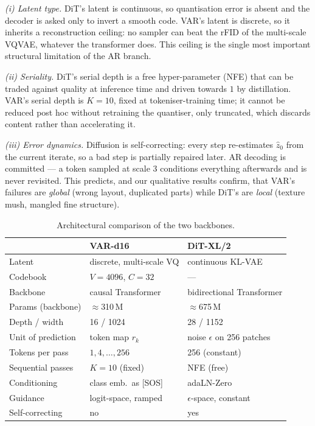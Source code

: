 \documentclass[conference]{IEEEtran}
\begin{document}
\emph{(i) Latent type.} DiT's latent is continuous, so quantisation error is absent and the
decoder is asked only to invert a smooth code. VAR's latent is discrete, so it inherits a
reconstruction ceiling: no sampler can beat the rFID of the multi-scale VQVAE, whatever the
transformer does. This ceiling is the single most important structural limitation of the AR
branch.

\emph{(ii) Seriality.} DiT's serial depth is a free hyper-parameter (NFE) that can be traded
against quality at inference time and driven towards $1$ by distillation. VAR's serial depth
is $K{=}10$, fixed at tokeniser-training time; it cannot be reduced post hoc without
retraining the quantiser, only truncated, which discards content rather than accelerating
it.

\emph{(iii) Error dynamics.} Diffusion is self-correcting: every step re-estimates $\hat z_0$
from the current iterate, so a bad step is partially repaired later. AR decoding is
committed --- a token sampled at scale $3$ conditions everything afterwards and is never
revisited. This predicts, and our qualitative results confirm, that VAR's failures are
\emph{global} (wrong layout, duplicated parts) while DiT's are \emph{local} (texture
mush, mangled fine structure).

\begin{table}[t]
\caption{Architectural comparison of the two backbones.}
\label{tab:arch}
\centering
\footnotesize
\begin{tabular}{@{}lll@{}}
\toprule
 & \textbf{VAR-d16} & \textbf{DiT-XL/2} \\
\midrule
Latent            & discrete, multi-scale VQ & continuous KL-VAE \\
Codebook          & $V{=}4096$, $C{=}32$     & --- \\
Backbone          & causal Transformer       & bidirectional Transformer \\
Params (backbone) & $\approx$310\,M          & $\approx$675\,M \\
Depth / width     & 16 / 1024                & 28 / 1152 \\
Unit of prediction& token map $r_k$          & noise $\epsilon$ on 256 patches \\
Tokens per pass   & $1,4,\dots,256$          & 256 (constant) \\
Sequential passes & $K{=}10$ (fixed)         & NFE (free) \\
Conditioning      & class emb.\ as [SOS]     & adaLN-Zero \\
Guidance          & logit-space, ramped      & $\epsilon$-space, constant \\
Self-correcting   & no                       & yes \\
\bottomrule
\end{tabular}
\end{table}
\end{document}
